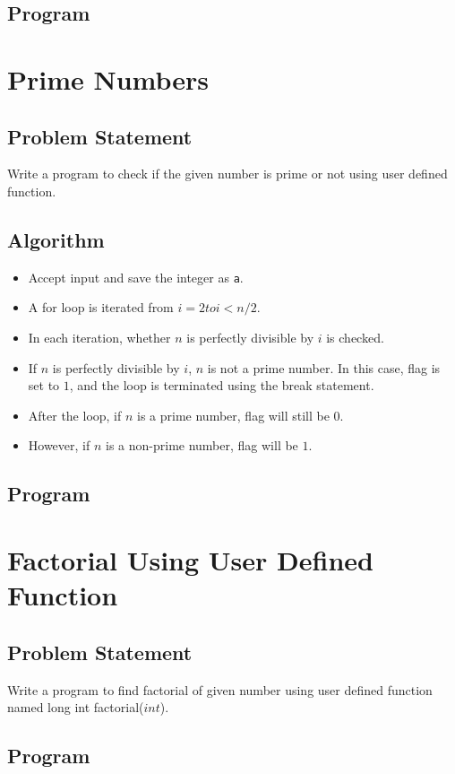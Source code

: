 \documentclass[11pt]{report}
\begin{document}
\section{Program}


\chapter{Prime Numbers}
\section{Problem Statement}
Write a program to check if the given number is prime or not using user defined function. 
\section{Algorithm}
\begin{itemize}
  \item Accept input and save the integer as \texttt{a}.
  \item A for loop is iterated from $i = 2 to i < n/2$.
  \item In each iteration, whether $n$ is perfectly divisible by $i$ is checked.
  \item If $n$ is perfectly divisible by $i$, $n$ is not a prime number. In this case, flag is set to $1$, and the loop is terminated using the break statement.
  \item After the loop, if $n$ is a prime number, flag will still be $0$.
  \item However, if $n$ is a non-prime number, flag will be $1$.
\end{itemize}
\leavevmode
\section{Program}


\chapter{Factorial Using User Defined Function}
\section{Problem Statement}
Write a program to find factorial of given number using user defined function named long int factorial($int$).

\section{Program}

\end{document}
